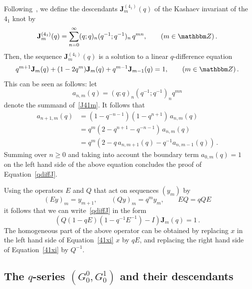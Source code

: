 \documentclass[12pt,reqno]{amsart}
\theoremstyle{definition}
\def\BZ{\mathbbm Z}
\def\J{\mathbf J}
\begin{document}
Following~\cite{GZ:kashaev}, we define the descendants
$\J^{(4_1)}_m(q)$ of the Kashaev invariant of the $4_1$ knot by
\begin{equation}
\label{J41m}
\J^{(4_1)}_m(q) = \sum_{n=0}^\infty (q;q)_n (q^{-1};q^{-1})_n \, q^{m n},
\qquad (m \in \BZ) \,.
\end{equation}
Then, the sequence $\J^{(4_1)}_m(q)$ is a solution to a linear $q$-difference
equation
\begin{equation}
\label{qdiffJ}
q^{m+1} \J_m(q) + (1-2q^m)\J_m(q) + q^{m-1} \J_{m-1}(q) =1,
\qquad (m \in \BZ) \,.
\end{equation}
This can be seen as follows: let
\begin{equation}
\label{anm41}
a_{n,m}(q)=
(q;q)_n (q^{-1};q^{-1})_n q^{m n}
\end{equation}
denote the summand of~\eqref{J41m}. It follows that
\begin{subequations}
  \begin{align}
    \label{ap1}
    a_{n+1,m}(q) &= (1-q^{-n-1})(1-q^{n+1}) \,a_{n,m}(q) \\
    \label{ap2}
    &= q^m(2-q^{n+1}-q^{-n-1}) \, a_{n,m}(q) \\
    \label{ap3}
  &= q^m(2-q \, a_{n,m+1}(q)-q^{-1} a_{n,m-1}(q)) \,.
\end{align}
\end{subequations}
Summing over $n \geq 0$ and taking into account the boundary term
$a_{0,m}(q)=1$ on the left hand side of the above equation concludes the
proof of Equation~\eqref{qdiffJ}.

Using the operators $E$ and $Q$ that act on sequences $(y_m)$ by
\begin{equation}
\label{EQ}
(Ey)_m=y_{m+1}, \qquad (Qy)_m=q^m y_m, \qquad EQ=qQE
\end{equation}
it follows that we can write~\eqref{qdiffJ} in the form
\begin{equation}
\label{qdiffJ2}
( Q(1-qE)(1-q^{-1}E^{-1}) - I) \J_m(q) = 1 \,.
\end{equation}
The homogeneous part of the above operator can be obtained by
replacing $x$ in the left hand side of Equation~\eqref{41xi} $x$ by
$qE$, and replacing the right hand side of Equation~\eqref{41xi} by
$Q^{-1}$.

\subsection{The $q$-series $(G^0_0,G^1_0)$ and their
  descendants}
\label{sub.gG41}
\end{document}
